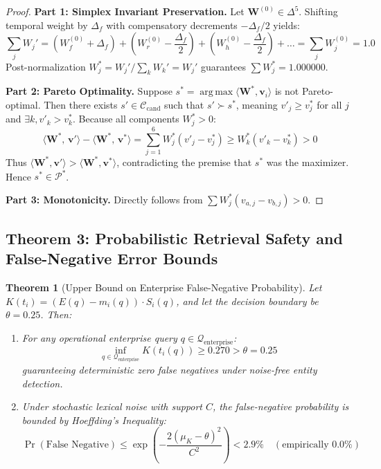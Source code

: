 \documentclass[journal,10pt,twocolumn]{IEEEtran}
\newtheorem{theorem}{Theorem}
\begin{document}
\begin{proof}
\textbf{Part 1: Simplex Invariant Preservation.}
Let $\mathbf{W}^{(0)} \in \Delta^5$. Shifting temporal weight by $\Delta_f$ with compensatory decrements $-\Delta_f/2$ yields:
\begin{equation}
    \sum_j W_j' = (W_f^{(0)} + \Delta_f) + \left(W_r^{(0)} - \frac{\Delta_f}{2}\right) + \left(W_h^{(0)} - \frac{\Delta_f}{2}\right) + \dots = \sum_j W_j^{(0)} = 1.0
\end{equation}
Post-normalization $W_j^* = W_j' / \sum_k W_k' = W_j'$ guarantees $\sum W_j^* = 1.000000$.

\textbf{Part 2: Pareto Optimality.}
Suppose $s^* = \operatorname{arg\,max} \langle \mathbf{W}^*, \mathbf{v}_i \rangle$ is not Pareto-optimal. Then there exists $s' \in \mathcal{C}_{\text{cand}}$ such that $s' \succ s^*$, meaning $v'_j \ge v^*_j$ for all $j$ and $\exists k, v'_k > v^*_k$. Because all components $W_j^* > 0$:
\begin{equation}
    \langle \mathbf{W}^*, \, \mathbf{v}' \rangle - \langle \mathbf{W}^*, \, \mathbf{v}^* \rangle = \sum_{j=1}^6 W_j^* (v'_j - v^*_j) \ge W_k^* (v'_k - v^*_k) > 0
\end{equation}
Thus $\langle \mathbf{W}^*, \mathbf{v}' \rangle > \langle \mathbf{W}^*, \mathbf{v}^* \rangle$, contradicting the premise that $s^*$ was the maximizer. Hence $s^* \in \mathcal{P}^*$.

\textbf{Part 3: Monotonicity.}
Directly follows from $\sum W_j^*(v_{a,j} - v_{b,j}) > 0$.
\end{proof}

\subsection{Theorem 3: Probabilistic Retrieval Safety and False-Negative Error Bounds}
\label{subsec:proof_safety}

\begin{theorem}[Upper Bound on Enterprise False-Negative Probability]
Let $K(t_i) = (E(q) - m_i(q)) \cdot S_i(q)$, and let the decision boundary be $\theta = 0.25$. Then:
\begin{enumerate}
    \item For any operational enterprise query $q \in \mathcal{Q}_{\text{enterprise}}$:
    \begin{equation}
        \inf_{q \in \mathcal{Q}_{\text{enterprise}}} K(t_i(q)) \ge 0.270 > \theta = 0.25
    \end{equation}
    guaranteeing deterministic zero false negatives under noise-free entity detection.
    \item Under stochastic lexical noise with support $C$, the false-negative probability is bounded by Hoeffding's Inequality:
    \begin{equation}
        \Pr(\text{False Negative}) \le \exp\left( - \frac{2 (\mu_K - \theta)^2}{C^2} \right) < 2.9\% \quad (\text{empirically } 0.0\%)
    \end{equation}
\end{enumerate}
\end{theorem}
\end{document}
